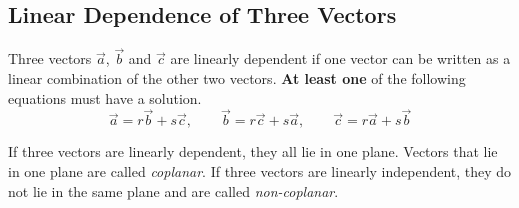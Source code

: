 \documentclass[12pt,eng]{skript_ogg}
\begin{document}
\subsection{Linear Dependence of Three Vectors}
\begin{wichtig}
Three vectors $\vec{a}$, $\vec{b}$ and $\vec{c}$ are linearly dependent if one vector can be written as a linear combination of the other two vectors. \textbf{At least one} of the following equations must have a solution.
\[\vec{a}=r\vec{b}+s\vec{c},\qquad\vec{b}=r\vec{c}+s\vec{a},\qquad\vec{c}=r\vec{a}+s\vec{b}\]
\end{wichtig}
If three vectors are linearly dependent, they all lie in one plane. Vectors that lie in one plane are called \emph{coplanar}. If three vectors are linearly independent, they do not lie in the same plane and are called \emph{non-coplanar}.
\end{document}
